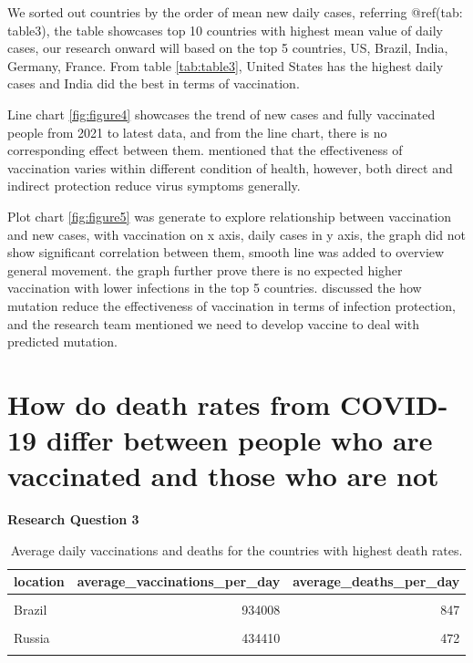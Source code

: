 \documentclass[11pt,a4paper,]{article}
\begin{document}
We sorted out countries by the order of mean new daily cases, referring @ref(tab: table3), the table showcases top 10 countries with highest mean value of daily cases, our research onward will based on the top 5 countries, US, Brazil, India, Germany, France. From table \ref{tab:table3}, United States has the highest daily cases and India did the best in terms of vaccination.

Line chart \ref{fig:figure4} showcases the trend of new cases and fully vaccinated people from 2021 to latest data, and from the line chart, there is no corresponding effect between them. \textcite{lipsitch2020understanding} mentioned that the effectiveness of vaccination varies within different condition of health, however, both direct and indirect protection reduce virus symptoms generally.

Plot chart \ref{fig:figure5} was generate to explore relationship between vaccination and new cases, with vaccination on x axis, daily cases in y axis, the graph did not show significant correlation between them, smooth line was added to overview general movement. the graph further prove there is no expected higher vaccination with lower infections in the top 5 countries. \textcite{chen2021prediction} discussed the how mutation reduce the effectiveness of vaccination in terms of infection protection, and the research team mentioned we need to develop vaccine to deal with predicted mutation.

\clearpage

\section*{ How do death rates from COVID-19 differ between people who are vaccinated and those who are not}

\textbf{Research Question 3}

\begin{table}[!h]

\caption{\label{tab:table}Average daily vaccinations and deaths for the countries with highest death rates.}
\centering
\begin{tabular}[t]{l|r|r}
\hline
location & average\_vaccinations\_per\_day & average\_deaths\_per\_day\\
\hline
\cellcolor{gray!6}{United States} & \cellcolor{gray!6}{1135290} & \cellcolor{gray!6}{1246}\\
\hline
Brazil & 934008 & 847\\
\hline
\cellcolor{gray!6}{India} & \cellcolor{gray!6}{4057187} & \cellcolor{gray!6}{657}\\
\hline
Russia & 434410 & 472\\
\hline
\cellcolor{gray!6}{Mexico} & \cellcolor{gray!6}{444551} & \cellcolor{gray!6}{407}\\
\hline
\end{tabular}
\end{table}
\end{document}
